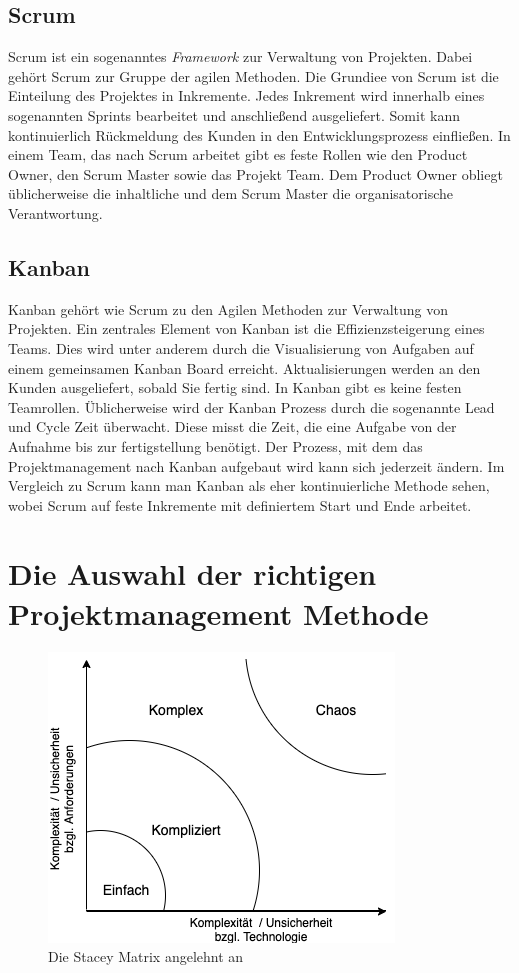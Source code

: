 \documentclass[twocolumn,10pt]{asme2ej}
\begin{document}
\subsection{Scrum}
Scrum ist ein sogenanntes \emph{Framework} zur Verwaltung von Projekten. Dabei gehört Scrum zur Gruppe der agilen Methoden. Die Grundiee von Scrum ist die Einteilung des Projektes in Inkremente. Jedes Inkrement wird innerhalb eines sogenannten Sprints bearbeitet und anschließend ausgeliefert. Somit kann kontinuierlich Rückmeldung des Kunden in den Entwicklungsprozess einfließen. In einem Team, das nach Scrum arbeitet gibt es feste Rollen wie den Product Owner, den Scrum Master sowie das Projekt Team. Dem Product Owner obliegt üblicherweise die inhaltliche und dem Scrum Master die organisatorische Verantwortung.

\subsection{Kanban}
Kanban gehört wie Scrum zu den Agilen Methoden zur Verwaltung von Projekten. Ein zentrales Element von Kanban ist die Effizienzsteigerung eines Teams. Dies wird unter anderem durch die Visualisierung von Aufgaben auf einem gemeinsamen Kanban Board erreicht.
Aktualisierungen werden an den Kunden ausgeliefert, sobald Sie fertig sind. In Kanban gibt es keine festen Teamrollen. Üblicherweise wird der Kanban Prozess durch die sogenannte Lead und Cycle Zeit überwacht. Diese misst die Zeit, die eine Aufgabe von der Aufnahme bis zur fertigstellung benötigt. Der Prozess, mit dem das Projektmanagement nach Kanban aufgebaut wird kann sich jederzeit ändern.  
Im Vergleich zu Scrum kann man Kanban als eher kontinuierliche Methode sehen, wobei Scrum auf feste Inkremente mit definiertem Start und Ende arbeitet.

\section{Die Auswahl der richtigen Projektmanagement Methode}

\begin{figure}
	\includegraphics[scale=0.65	]{stacey.png}
	\caption[center]{Die Stacey Matrix angelehnt an \cite{stacey_img}}
	\label{fig:stacey}
\end{figure}
\end{document}
